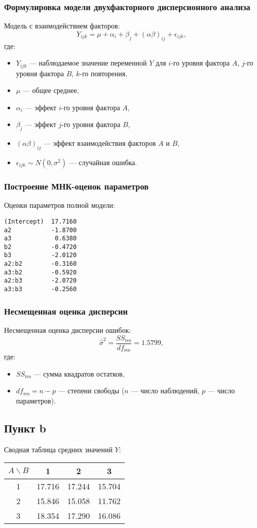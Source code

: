 \documentclass[12pt]{spbstu-task}
\begin{document}
\subsubsection{Формулировка модели двухфакторного дисперсионного анализа}
\label{sec:org86aff1a}
Модель с взаимодействием факторов: \[Y_{ijk} = \mu + \alpha_i +
\beta_j + (\alpha \beta)_{ij} + \epsilon_{ijk},\] где:
\begin{itemize}
\item \(Y_{ijk}\) --- наблюдаемое значение переменной \(Y\) для \(i\)-го
уровня фактора \(A\), \(j\)-го уровня фактора \(B\), \(k\)-го
повторения,
\item \(\mu\) --- общее среднее,
\item \(\alpha_i\) --- эффект \(i\)-го уровня фактора \(A\),
\item \(\beta_j\) --- эффект \(j\)-го уровня фактора \(B\),
\item \((\alpha \beta)_{ij}\) --- эффект взаимодействия факторов \(A\) и
\(B\),
\item \(\epsilon_{ijk} \sim N(0, \sigma^2)\) --- случайная ошибка.
\end{itemize}
\subsubsection{Построение МНК-оценок параметров}
\label{sec:orga0bcff0}
Оценки параметров полной модели:
\begin{verbatim}
(Intercept)  17.7160
a2           -1.8700
a3            0.6380
b2           -0.4720
b3           -2.0120
a2:b2        -0.3160
a3:b2        -0.5920
a2:b3        -2.0720
a3:b3        -0.2560
\end{verbatim}
\subsubsection{Несмещенная оценка дисперсии}
\label{sec:org9861127}
Несмещенная оценка дисперсии ошибок: 
\[\hat{\sigma}^2 = \frac{SS_{\text{res}}}{df_{\text{res}}} = 1.5799,\] где:
\begin{itemize}
\item \(SS_{\text{res}}\) --- сумма квадратов остатков,
\item \(df_{\text{res}} = n - p\) --- степени свободы (\(n\) --- число
наблюдений, \(p\) --- число параметров).
\end{itemize}
\subsection{Пункт b}
\label{sec:org071f9e8}
Сводная таблица средних значений \(Y\):
\begin{table}[H]
  \centering
  \begin{tabular}{c|ccc} \toprule
    $A \backslash B$ & 1 & 2 & 3 \\ \midrule
    1 & 17.716 & 17.244 & 15.704 \\
    2 & 15.846 & 15.058 & 11.762 \\
    3 & 18.354 & 17.290 & 16.086 \\ \bottomrule
  \end{tabular}
\end{table}
\end{document}
